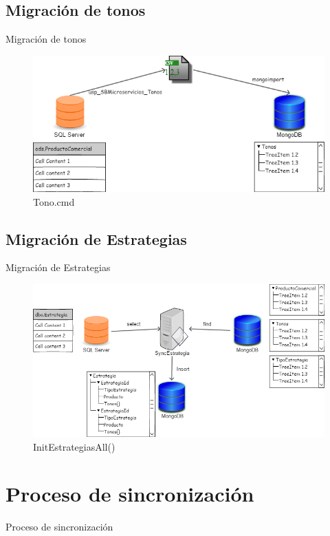 \documentclass{bredelebeamer}
\begin{document}
\subsection{Migración de tonos}
\begin{frame}{Migración de tonos}
\begin{figure}
\centering
\includegraphics[scale=0.35]{imgs/Tonos.png}
\caption{Tono.cmd}
\end{figure}
\end{frame}

\subsection{Migración de Estrategias}
\begin{frame}{Migración de Estrategias}
\begin{figure}
\centering
\includegraphics[scale=0.35]{imgs/Estrategia.png}
\caption{InitEstrategiasAll()}
\end{figure}
\end{frame}

\section{Proceso de sincronización}
\begin{frame}{Proceso de sincronización}
\end{frame}
\end{document}
